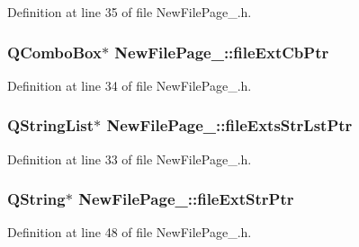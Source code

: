 Definition at line 35 of file New\-File\-Page\-\_.\-h.

\hypertarget{class_new_file_page__4_afd3b7539e238b941bb03f981f087ed46}{
\subsubsection[{file\-Ext\-Cb\-Ptr}]{\setlength{\rightskip}{0pt plus 5cm}Q\-Combo\-Box$\ast$ New\-File\-Page\-\_\-::file\-Ext\-Cb\-Ptr\hspace{0.3cm}{\ttfamily [private]}}}\label{class_new_file_page__4_afd3b7539e238b941bb03f981f087ed46}


Definition at line 34 of file New\-File\-Page\-\_.\-h.

\hypertarget{class_new_file_page__4_a33598f1f6153aa6c94c6100ff5864b3a}{
\subsubsection[{file\-Exts\-Str\-Lst\-Ptr}]{\setlength{\rightskip}{0pt plus 5cm}Q\-String\-List$\ast$ New\-File\-Page\-\_\-::file\-Exts\-Str\-Lst\-Ptr\hspace{0.3cm}{\ttfamily [private]}}}\label{class_new_file_page__4_a33598f1f6153aa6c94c6100ff5864b3a}


Definition at line 33 of file New\-File\-Page\-\_.\-h.

\hypertarget{class_new_file_page__4_abc0414737b129a20508aec86d31f830a}{
\subsubsection[{file\-Ext\-Str\-Ptr}]{\setlength{\rightskip}{0pt plus 5cm}Q\-String$\ast$ New\-File\-Page\-\_\-::file\-Ext\-Str\-Ptr\hspace{0.3cm}{\ttfamily [private]}}}\label{class_new_file_page__4_abc0414737b129a20508aec86d31f830a}


Definition at line 48 of file New\-File\-Page\-\_.\-h.

